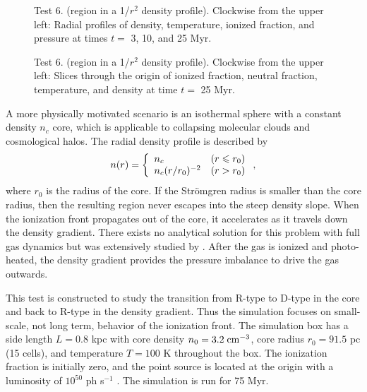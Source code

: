 \documentclass[useAMS,usenatbib,a4paper]{mn2e}
\begin{document}
\begin{figure}
  \caption{\label{fig:test6_2} Test 6. (\hii region in a 1/$r^2$
    density profile).  Clockwise from the upper left: Radial profiles of
    density, temperature, ionized fraction, and pressure at times $t
    =$ 3, 10, and 25 Myr.}
\end{figure}

\begin{figure*}
  \caption{\label{fig:test6_3} Test 6. (\hii region in a 1/$r^2$
    density profile).  Clockwise from the upper left: Slices through the origin
    of ionized fraction, neutral fraction, temperature, and density at
    time $t =$ 25 Myr.}
\end{figure*}

A more physically motivated scenario is an isothermal sphere with a
constant density $n_c$ core, which is applicable to collapsing
molecular clouds and cosmological halos.  The radial density profile
is described by
%
\begin{equation}
  \label{eqn:test6_rho}
  n(r) = \left\{ \begin{array}{l@{\quad}l}
      n_c & (r \le r_0)\\
      n_c (r/r_0)^{-2} & (r > r_0)
    \end{array} \right. ,
\end{equation}
where $r_0$ is the radius of the core.  If the Str\"{o}mgren radius is
smaller than the core radius, then the resulting \hii region
never escapes into the steep density slope.  When the ionization front
propagates out of the core, it accelerates as it travels down the
density gradient.  There exists no analytical solution for this
problem with full gas dynamics but was extensively studied by
\citet{Franco90}.  After the gas is ionized and photo-heated, the
density gradient provides the pressure imbalance to drive the gas
outwards.

This test is constructed to study the transition from R-type to D-type
in the core and back to R-type in the density gradient.  Thus the
simulation focuses on small-scale, not long term, behavior of the
ionization front.  The simulation box has a side length $L = 0.8$ kpc
with core density $n_0 = 3.2\;\cubecm$, core radius $r_0 = 91.5$ pc
(15 cells), and temperature $T = 100$ K throughout the box.  The
ionization fraction is initially zero, and the point source is located
at the origin with a luminosity of $10^{50}$ ph s$^{-1}$ \cubecm.  The
simulation is run for 75 Myr.
\end{document}
